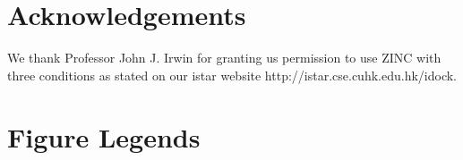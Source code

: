 \documentclass[10pt]{article}
\begin{document}
\section*{Acknowledgements}
We thank Professor John J. Irwin for granting us permission to use ZINC \cite{532,1178} with three conditions as stated on our istar website http://istar.cse.cuhk.edu.hk/idock.



\section*{Figure Legends}
\end{document}
